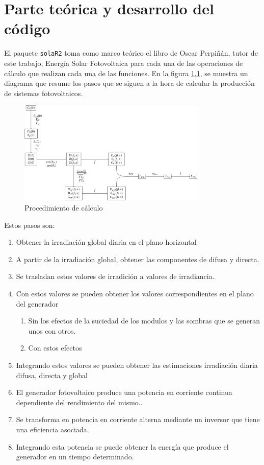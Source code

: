 \chapter{Parte teórica y desarrollo del código}
\label{chap:parte-teorica-desarrollo-código}
El paquete \texttt{solaR2} toma como marco teórico el libro de Oscar Perpiñán, tutor de este trabajo, Energía Solar Fotovoltaica \cite{Perpinan2023} para cada una de las operaciones de cálculo que realizan cada una de las funciones.
En la figura \ref{fig:orgf5ef9b9}, se muestra un diagrama que resume los pasos que se siguen a la hora de calcular la producción de sistemas fotovoltaicos.
\begin{figure}[]
\centering
\includegraphics[keepaspectratio,width=0.8\textwidth,height=0.5\textheight]{figuras/ProcedimientoCalculoRadiacionInclinada.pdf}
\caption{\label{fig:orgf5ef9b9}Procedimiento de cálculo}
\end{figure}
Estos pasos son:
\begin{enumerate}
\item Obtener la irradiación global diaria en el plano horizontal
\item A partir de la irradiación global, obtener las componentes de difusa y directa.
\item Se trasladan estos valores de irradición a valores de irradiancia.
\item Con estos valores se pueden obtener los valores correspondientes en el plano del generador
\begin{enumerate}
\item Sin los efectos de la suciedad de los modulos y las sombras que se generan unos con otros.
\item Con estos efectos
\end{enumerate}
\item Integrando estos valores se pueden obtener las estimaciones irradiación diaria difusa, directa y global
\item El generador fotovoltaico produce una potencia en corriente continua dependiente del rendimiento del mismo..
\item Se transforma en potencia en corriente alterna mediante un inversor que tiene una eficiencia asociada.
\item Integrando esta potencia se puede obtener la energía que produce el generador en un tiempo determinado.
\end{enumerate}

